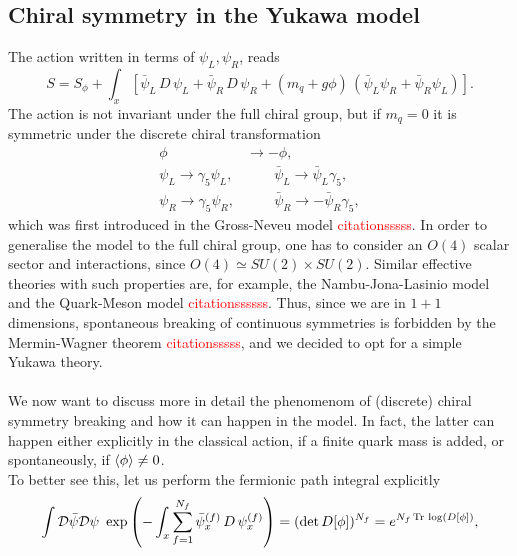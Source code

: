 \subsection{Chiral symmetry in the Yukawa model}
The action written in terms of $\psi_L, \psi_R$, reads
\begin{equation}
	S = S_\phi +  \int_x \left[\bar\psi_L \, D \, \psi_L + \bar\psi_R \, D \, \psi_R + (m_q + g\phi) \,  \left(\bar\psi_L\psi_R + \bar\psi_R\psi_L\right)\right].
	\label{eq:action_chirality_explicit}
\end{equation}
The action is not invariant under the full chiral group, but if $m_q = 0$ it is symmetric under the discrete chiral transformation
\begin{equation*}
    \begin{aligned}
        \phi &\to -\phi, \\
        \psi_L \to \gamma_5 \psi_L, &\qquad \bar\psi_L \to \bar\psi_L\gamma_5, \\
        \psi_R \to \gamma_5 \psi_R, &\qquad \bar\psi_R \to -\bar\psi_R\gamma_5,
    \end{aligned}
\end{equation*}
which was first introduced in the Gross-Neveu model \textcolor{red}{citationsssss}. In order to generalise the model to the full chiral group, one has to consider an $O(4)$ scalar sector and interactions, since $O(4) \simeq SU(2) \times SU(2)$. Similar effective theories with such properties are, for example, 
the Nambu-Jona-Lasinio model and the Quark-Meson model \textcolor{red}{citationssssss}. Thus, since we are in $1+1$ dimensions, spontaneous breaking of continuous symmetries is forbidden by the Mermin-Wagner theorem \textcolor{red}{citationsssss}, and we decided to opt for a simple Yukawa theory. \\~\\
We now want to discuss more in detail the phenomenom of (discrete) chiral symmetry breaking and how it can happen in the model. In fact, the latter can happen either
explicitly in the classical action, if a finite quark mass is added, or spontaneously, if $\left\langle \phi \right\rangle \neq 0$. \\
To better see this, let us perform the fermionic path integral explicitly
\begin{equation*}
    \int \mathcal{D} \bar\psi \mathcal{D} \psi \ \exp\left( - \int_x \sum_{f=1}^{N_f} \bar\psi_x^{(f)} \,  D \, \psi_x^{(f)} \right) = (\text{det} \, D[\phi])^{N_f} = e^{N_f\operatorname{\text{Tr} \,} \log (D[\phi])},
\end{equation*}
